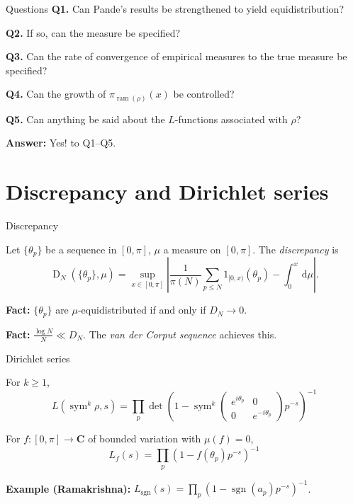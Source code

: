 \documentclass[handout]{beamer}
\DeclareMathOperator{\D}{D}
\DeclareMathOperator{\ram}{ram}
\DeclareMathOperator{\sgn}{sgn}
\DeclareMathOperator{\sym}{sym}
\newcommand{\bC}{\mathbf{C}}
\newcommand{\dd}{\mathrm{d}}
\begin{document}
\begin{frame}{Questions}
\textbf{Q1.} Can Pande's results be strengthened to yield equidistribution? 
\pause

\textbf{Q2.} If so, can the measure be specified?
\pause

\textbf{Q3.} Can the rate of convergence of empirical measures to the true measure 
be specified?

\textbf{Q4.} Can the growth of $\pi_{\ram(\rho)}(x)$ be controlled?
\pause

\textbf{Q5.} Can anything be said about the $L$-functions associated with $\rho$?
\pause

\textbf{Answer:} Yes! to Q1--Q5. 
\end{frame}





\section{Discrepancy and Dirichlet series}


\begin{frame}{Discrepancy}
\begin{definition}
Let $\{\theta_p\}$ be a sequence in $[0,\pi]$, $\mu$ a measure on $[0,\pi]$. 
The \emph{discrepancy} is 
\[
	\D_N(\{\theta_p\},\mu) =  \sup_{x\in [0,\pi]}\left| \frac{1}{\pi(N)} \sum_{p\leqslant N} 1_{[0,x)}(\theta_p) - \int_0^x \, \dd\mu\right| .
\]
\end{definition}
\pause

\textbf{Fact:}
$\{\theta_p\}$ are $\mu$-equidistributed if and only if $D_N \to 0$. 
\pause

\textbf{Fact:}
$\frac{\log N}{N} \ll D_N$. The \emph{van der Corput sequence} achieves this. 
\end{frame}


\begin{frame}{Dirichlet series}
\begin{definition}
For $k\geqslant 1$, 
\[
	L(\sym^k \rho,s) = \prod_p \det\left( 1 - \sym^k \left(\begin{smallmatrix} e^{i \theta_p} & 0\\ 0 & e^{-i \theta_p}\end{smallmatrix}\right) p^{-s}\right)^{-1}
\]
\end{definition}
\pause

\begin{definition}
For $f\colon [0,\pi] \to \bC$ of bounded variation with $\mu(f) = 0$,  
\[
	L_f(s) = \prod_p \left( 1 - f(\theta_p) p^{-s}\right)^{-1}
\]
\end{definition}
\pause

\textbf{Example (Ramakrishna):}
$L_{\sgn}(s) = \prod_p \left(1 - \sgn(a_p) p^{-s}\right)^{-1}$. 
\end{frame}
\end{document}
